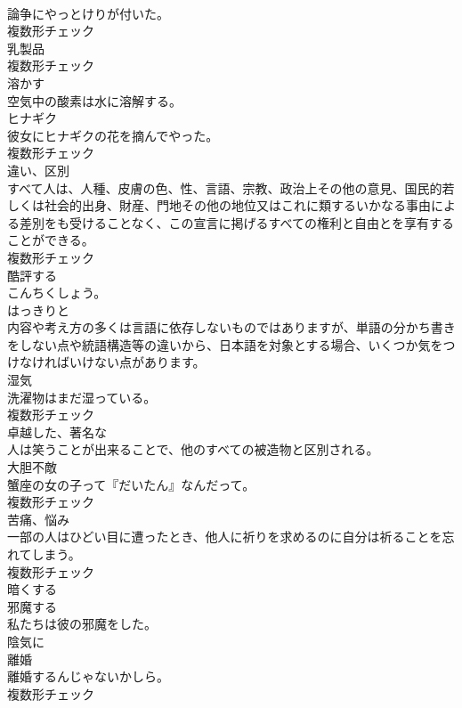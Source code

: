 \documentclass[8pt]{extreport}
\begin{document}
\begin{CJK}{UTF8}{min}
\\	論争にやっとけりが付いた。	
\\	複数形チェック
\\	[名詞]	乳製品	
\\	複数形チェック
\\	[動詞]	溶かす	
\\	空気中の酸素は水に溶解する。	
\\	[名詞]	ヒナギク	
\\	彼女にヒナギクの花を摘んでやった。	
\\	複数形チェック
\\	[名詞]	違い、区別	
\\	すべて人は、人種、皮膚の色、性、言語、宗教、政治上その他の意見、国民的若しくは社会的出身、財産、門地その他の地位又はこれに類するいかなる事由による差別をも受けることなく、この宣言に掲げるすべての権利と自由とを享有することができる。	
\\	複数形チェック
\\	[動詞]	酷評する	
\\	こんちくしょう。	
\\	[副詞]	はっきりと	
\\	内容や考え方の多くは言語に依存しないものではありますが、単語の分かち書きをしない点や統語構造等の違いから、日本語を対象とする場合、いくつか気をつけなければいけない点があります。	
\\	[名詞]	湿気	
\\	洗濯物はまだ湿っている。	
\\	複数形チェック
\\	[形容詞]	卓越した、著名な	
\\	人は笑うことが出来ることで、他のすべての被造物と区別される。	
\\	[名詞]	大胆不敵	
\\	蟹座の女の子って『だいたん』なんだって。	
\\	複数形チェック
\\	[名詞]	苦痛、悩み	
\\	一部の人はひどい目に遭ったとき、他人に祈りを求めるのに自分は祈ることを忘れてしまう。	
\\	複数形チェック
\\	[動詞]	暗くする	
\\	[動詞]	邪魔する	
\\	私たちは彼の邪魔をした。	
\\	[副詞]	陰気に	
\\	[名詞]	離婚	
\\	離婚するんじゃないかしら。	
\\	複数形チェック

\end{CJK}
\end{document}
